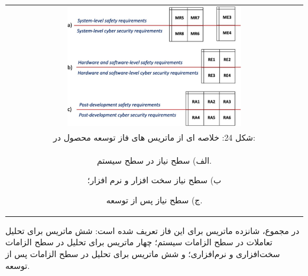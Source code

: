 \documentclass[a4paper,10pt]{article}
\begin{document}
                \begin{table}
            
                    \centering
                    \begin{tabular}{ c }
                        
                        \includegraphics[width=0.6\textwidth]{Image/fig24.jpg} \\

                        شکل 24: خلاصه ای از ماتریس های فاز توسعه محصول در:\\
                        
                        الف) سطح نیاز در سطح سیستم.
                        
                        ب) سطح نیاز سخت افزار و نرم افزار؛
                        
                        ج) سطح نیاز پس از توسعه.

                    \end{tabular}
        
                \end{table}

                در مجموع، شانزده ماتریس برای این فاز تعریف شده است: شش ماتریس برای تحلیل تعاملات در سطح الزامات سیستم؛ چهار ماتریس برای تحلیل در سطح الزامات سخت‌افزاری و نرم‌افزاری؛ و شش ماتریس برای تحلیل در سطح الزامات پس از توسعه.
\end{document}
